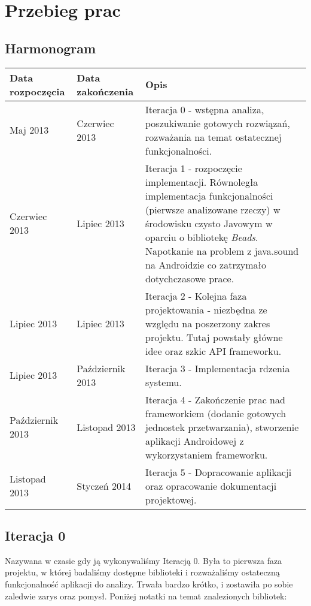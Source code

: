 \chapter{Przebieg prac}

\section{Harmonogram}

\begin{center}
    \begin{tabular}{| l | l | p{9cm} |}
    \hline
    Data rozpoczęcia & Data zakończenia & Opis \\ \hline
    Maj 2013 & Czerwiec 2013 & Iteracja 0 - wstępna analiza, poszukiwanie gotowych rozwiązań, rozważania na temat ostatecznej funkcjonalności. \\ \hline
    Czerwiec 2013 & Lipiec 2013 & Iteracja 1 - rozpoczęcie implementacji. Równoległa implementacja funkcjonalności (pierwsze analizowane rzeczy) w środowisku czysto Javowym w oparciu o bibliotekę \emph{Beads}. Napotkanie na problem z java.sound na Androidzie co zatrzymało dotychczasowe prace. \\ \hline
    Lipiec 2013 & Lipiec 2013 & Iteracja 2 - Kolejna faza projektowania - niezbędna ze względu na poszerzony zakres projektu. Tutaj powstały główne idee oraz szkic API frameworku.  \\ \hline
    Lipiec 2013 & Październik 2013 & Iteracja 3 - Implementacja rdzenia systemu. \\ \hline
    Październik 2013 & Listopad 2013 & Iteracja 4 - Zakończenie prac nad frameworkiem (dodanie gotowych jednostek przetwarzania), stworzenie aplikacji Androidowej z wykorzystaniem frameworku. \\ \hline
    Listopad 2013 & Styczeń 2014 & Iteracja 5 - Dopracowanie aplikacji oraz opracowanie dokumentacji projektowej. \\ \hline
    \end{tabular}
\end{center}


\section{Iteracja 0}
Nazywana w czasie gdy ją wykonywaliśmy Iteracją 0. Była to pierwsza faza projektu, w której badaliśmy dostępne biblioteki i rozważaliśmy ostateczną funkcjonalność aplikacji do analizy. Trwała bardzo krótko, i zostawiła po sobie zaledwie zarys oraz pomysł. Poniżej notatki na temat znalezionych bibliotek:

